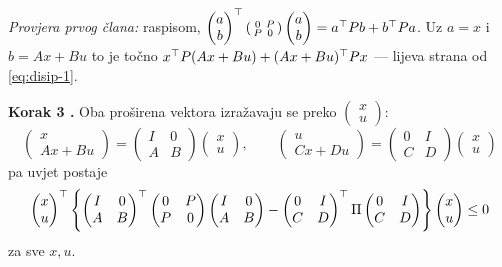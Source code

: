 \emph{Provjera prvog člana:} raspisom,
$\begin{pmatrix}a\\b\end{pmatrix}^{\top}\begin{psmallmatrix}0 & P\\ P & 0
\end{psmallmatrix}\begin{pmatrix}a\\b\end{pmatrix} = a^{\top} Pb + b^{\top} Pa$. Uz
$a = x$ i $b = Ax+Bu$ to je točno $x^{\top} P(Ax+Bu) + (Ax+Bu)^{\top} Px$ --- lijeva
strana od \eqref{eq:disip-1}. \checkmark

\textbf{Korak 3 .} Oba proširena vektora izražavaju se preko
$\begin{pmatrix}x\\u\end{pmatrix}$:
\[
\begin{pmatrix}x\\ Ax+Bu\end{pmatrix}
= \begin{pmatrix}I & 0\\ A & B\end{pmatrix}
  \begin{pmatrix}x\\u\end{pmatrix},
\qquad
\begin{pmatrix}u\\ Cx+Du\end{pmatrix}
= \begin{pmatrix}0 & I\\ C & D\end{pmatrix}
  \begin{pmatrix}x\\u\end{pmatrix}
\]
pa uvjet postaje
\[
\begin{pmatrix}x\\u\end{pmatrix}^{\top}
\left\{
\begin{pmatrix}I & 0\\ A & B\end{pmatrix}^{\top}
\begin{pmatrix}0 & P\\ P & 0\end{pmatrix}
\begin{pmatrix}I & 0\\ A & B\end{pmatrix}
- \begin{pmatrix}0 & I\\ C & D\end{pmatrix}^{\top}\Pi
\begin{pmatrix}0 & I\\ C & D\end{pmatrix}
\right\}
\begin{pmatrix}x\\u\end{pmatrix} \le 0
\]
za sve $x, u$.

